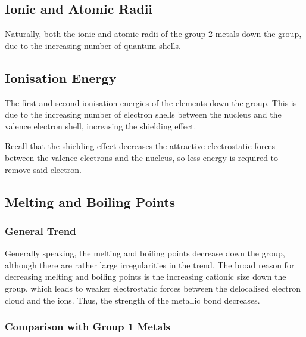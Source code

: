 




		\subsection{Ionic and Atomic Radii}

			Naturally, both the ionic and atomic radii of the group 2 metals  down the group, due to the increasing
			number of quantum shells.


		\pagebreak
		\subsection{Ionisation Energy}

			The first and second ionisation energies of the elements  down the group. This is due to the increasing number of
			electron shells between the nucleus and the valence electron shell, increasing the shielding effect.

			Recall that the shielding effect decreases the attractive electrostatic forces between the valence electrons and the nucleus, so less
			energy is required to remove said electron.


		\subsection{Melting and Boiling Points}

			\subsubsection{General Trend}

				Generally speaking, the melting and boiling points decrease down the group, although there are rather large irregularities in
				the trend. The broad reason for decreasing melting and boiling points is the increasing cationic size down the group, which leads
				to weaker electrostatic forces between the delocalised electron cloud and the ions. Thus, the strength of the metallic bond decreases.



			\subsubsection{Comparison with Group 1 Metals}

